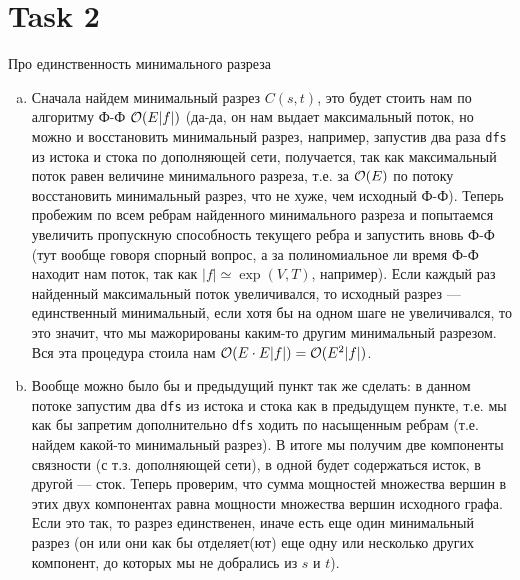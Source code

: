 \section{Task 2}
\begin{task}
    Про единственность минимального разреза
\end{task}

\begin{solution}
    \begin{enumerate}[a)]
        \item Сначала найдем минимальный разрез $C(s,t)$, это будет стоить нам по алгоритму Ф-Ф $\mathcal{O}(E|f|)$ (да-да, он нам выдает максимальный поток, но можно и восстановить минимальный разрез, например, запустив два раза \texttt{dfs} из истока и стока по дополняющей сети, получается, так как максимальный поток равен величине минимального разреза, т.е. за $\mathcal{O}(E)$ по потоку восстановить минимальный разрез, что не хуже, чем исходный Ф-Ф).
        Теперь пробежим по всем ребрам найденного минимального разреза и попытаемся увеличить пропускную способность текущего ребра и запустить вновь Ф-Ф (тут вообще говоря спорный вопрос, а за полиномиальное ли время Ф-Ф находит нам поток, так как $|f|\simeq \exp(V,T)$, например). Если каждый раз найденный максимальный поток увеличивался, то исходный разрез --- единственный минимальный, если хотя бы на одном шаге не увеличивался, то это значит, что мы мажорированы каким-то другим минимальный разрезом.
        Вся эта процедура стоила нам $\mathcal{O}(E\cdot E|f|) = \mathcal{O}(E^2|f|)$.

        \item Вообще можно было бы и предыдущий пункт так же сделать: в данном потоке запустим два \texttt{dfs} из истока и стока как в предыдущем пункте, т.е. мы как бы запретим дополнительно \texttt{dfs} ходить по насыщенным ребрам (т.е. найдем какой-то минимальный разрез).
        В итоге мы получим две компоненты связности (с т.з. дополняющей сети), в одной будет содержаться исток, в другой --- сток. Теперь проверим, что сумма мощностей множества вершин в этих двух компонентах равна мощности множества вершин исходного графа.
        Если это так, то разрез единственен, иначе есть еще один минимальный разрез (он или они как бы отделяет(ют) еще одну или несколько других компонент, до которых мы не добрались из $s$ и $t$).

    \end{enumerate}
    
\end{solution}
